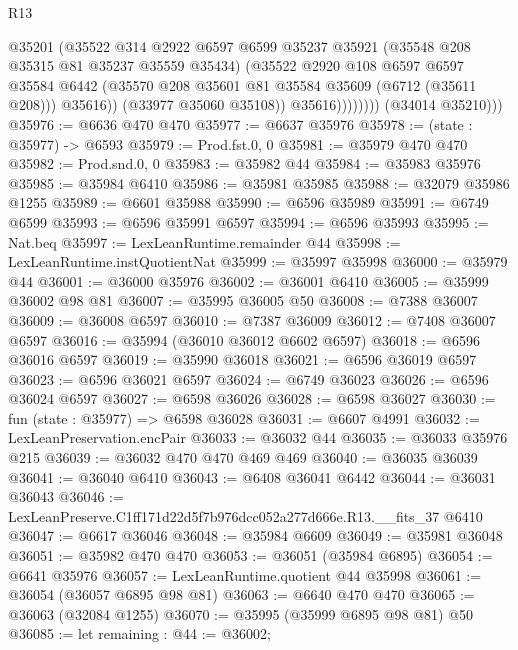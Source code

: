 \begin{lexlean}{R13}
\begin{coremodule}
                          @35201
                          (@35522
                            @314
                            @2922
                            @6597
                            @6599
                            @35237
                            @35921
                            (@35548 @208 @35315 @81 @35237 @35559 @35434)
                            (@35522
                              @2920
                              @108
                              @6597
                              @6597
                              @35584
                              @6442
                              (@35570 @208 @35601 @81 @35584 @35609 (@6712 (@35611 @208)))
                              @35616))
                          (@33977 @35060 @35108))
                        @35616))))))))
        (@34014 @35210)))
@35976 := @6636 @470 @470
@35977 := @6637 @35976
@35978 := (state : @35977) -> @6593
@35979 := Prod.fst.{0, 0}
@35981 := @35979 @470 @470
@35982 := Prod.snd.{0, 0}
@35983 := @35982 @44
@35984 := @35983 @35976
@35985 := @35984 @6410
@35986 := @35981 @35985
@35988 := @32079 @35986 @1255
@35989 := @6601 @35988
@35990 := @6596 @35989
@35991 := @6749 @6599
@35993 := @6596 @35991 @6597
@35994 := @6596 @35993
@35995 := Nat.beq
@35997 := LexLeanRuntime.remainder @44
@35998 := LexLeanRuntime.instQuotientNat
@35999 := @35997 @35998
@36000 := @35979 @44
@36001 := @36000 @35976
@36002 := @36001 @6410
@36005 := @35999 @36002 @98 @81
@36007 := @35995 @36005 @50
@36008 := @7388 @36007
@36009 := @36008 @6597
@36010 := @7387 @36009
@36012 := @7408 @36007 @6597
@36016 := @35994 (@36010 @36012 @6602 @6597)
@36018 := @6596 @36016 @6597
@36019 := @35990 @36018
@36021 := @6596 @36019 @6597
@36023 := @6596 @36021 @6597
@36024 := @6749 @36023
@36026 := @6596 @36024 @6597
@36027 := @6598 @36026
@36028 := @6598 @36027
@36030 := fun (state : @35977) => @6598 @36028
@36031 := @6607 @4991
@36032 := LexLeanPreservation.encPair
@36033 := @36032 @44
@36035 := @36033 @35976 @215
@36039 := @36032 @470 @470 @469 @469
@36040 := @36035 @36039
@36041 := @36040 @6410
@36043 := @6408 @36041 @6442
@36044 := @36031 @36043
@36046 := LexLeanPreserve.C1ff171d22d5f7b976dcc052a277d666e.R13.__fits_37 @6410
@36047 := @6617 @36046
@36048 := @35984 @6609
@36049 := @35981 @36048
@36051 := @35982 @470 @470
@36053 := @36051 (@35984 @6895)
@36054 := @6641 @35976
@36057 := LexLeanRuntime.quotient @44 @35998
@36061 := @36054 (@36057 @6895 @98 @81)
@36063 := @6640 @470 @470
@36065 := @36063 (@32084 @1255)
@36070 := @35995 (@35999 @6895 @98 @81) @50
@36085 := let remaining : @44 := @36002;

\end{coremodule}
\end{lexlean}
